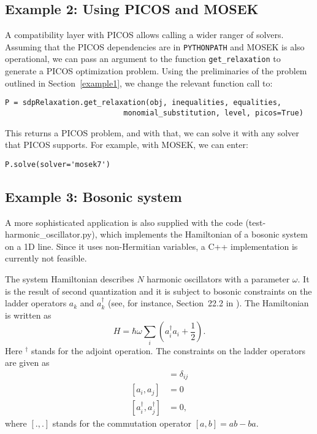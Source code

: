\documentclass{article}
\begin{document}
\subsection{Example 2: Using PICOS and MOSEK}
A compatibility layer with PICOS allows calling a wider ranger of solvers. Assuming that the PICOS dependencies are in \verb+PYTHONPATH+ and MOSEK is also operational, we can pass an argument to the function \verb+get_relaxation+ to generate a PICOS optimization problem. Using the preliminaries of the problem outlined in Section~\ref{example1}, we change the relevant function call to:
\begin{verbatim}
P = sdpRelaxation.get_relaxation(obj, inequalities, equalities,
                           monomial_substitution, level, picos=True)
\end{verbatim}
This returns a PICOS problem, and with that, we can solve it with any solver that PICOS supports. For example, with MOSEK, we can enter:
\begin{verbatim}
P.solve(solver='mosek7')
\end{verbatim}

\subsection{Example 3: Bosonic system}
A more sophisticated application is  also supplied with the code (test-harmonic\_oscillator.py), which implements the Hamiltonian of a bosonic system on a 1D line. Since it uses non-Hermitian variables, a C++ implementation is currently not feasible.

The system Hamiltonian describes $N$ harmonic oscillators with a parameter $\omega$. It is the result of second quantization and it is subject to bosonic constraints on the ladder operators $a_{k}$ and $a_{k}^{\dagger}$ (see, for instance, Section~22.2 in \cite{fayngold2013quantum}). The Hamiltonian is written as
\begin{equation}
  H = \hbar \omega\sum_{i}\left(a_{i}^{\dagger}a_{i}+\frac{1}{2}\right).
\end{equation}
Here $^{\dagger}$ stands for the adjoint operation. The constraints on the ladder operators are given as
\begin{align}
[a_{i},a_{j}^{\dagger}] &=  \delta_{ij} \\
[a_{i},a_{j}]  &=  0 \nonumber \\
[a_{i}^{\dagger},a_{j}^{\dagger}] &=  0,\nonumber
\end{align}
where $[.,.]$ stands for the commutation operator $[a,b]=ab-ba$. 
\end{document}
